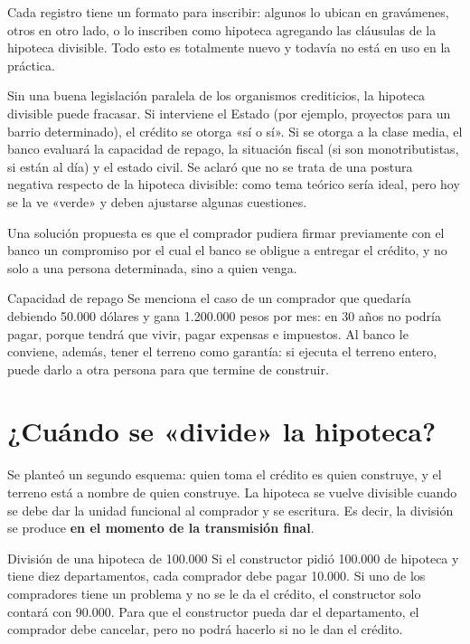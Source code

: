 \documentclass[12pt,oneside]{book}
\begin{document}
Cada registro tiene un formato para inscribir: algunos lo ubican en gravámenes, otros en otro lado, o lo inscriben como hipoteca agregando las cláusulas de la hipoteca divisible. Todo esto es totalmente nuevo y todavía no está en uso en la práctica.

\begin{important}
Sin una buena legislación paralela de los organismos crediticios, la hipoteca divisible puede fracasar. Si interviene el Estado (por ejemplo, proyectos para un barrio determinado), el crédito se otorga «sí o sí». Si se otorga a la clase media, el banco evaluará la capacidad de repago, la situación fiscal (si son monotributistas, si están al día) y el estado civil. Se aclaró que no se trata de una postura negativa respecto de la hipoteca divisible: como tema teórico sería ideal, pero hoy se la ve «verde» y deben ajustarse algunas cuestiones.
\end{important}

Una solución propuesta es que el comprador pudiera firmar previamente con el banco un compromiso por el cual el banco se obligue a entregar el crédito, y no solo a una persona determinada, sino a quien venga.

\begin{example}{Capacidad de repago}
Se menciona el caso de un comprador que quedaría debiendo 50.000 dólares y gana 1.200.000 pesos por mes: en 30 años no podría pagar, porque tendrá que vivir, pagar expensas e impuestos. Al banco le conviene, además, tener el terreno como garantía: si ejecuta el terreno entero, puede darlo a otra persona para que termine de construir.
\end{example}

\section{¿Cuándo se «divide» la hipoteca?}

Se planteó un segundo esquema: quien toma el crédito es quien construye, y el terreno está a nombre de quien construye. La hipoteca se vuelve divisible cuando se debe dar la unidad funcional al comprador y se escritura. Es decir, la división se produce \textbf{en el momento de la transmisión final}.

\begin{example}{División de una hipoteca de 100.000}
Si el constructor pidió 100.000 de hipoteca y tiene diez departamentos, cada comprador debe pagar 10.000. Si uno de los compradores tiene un problema y no se le da el crédito, el constructor solo contará con 90.000. Para que el constructor pueda dar el departamento, el comprador debe cancelar, pero no podrá hacerlo si no le dan el crédito.
\end{example}
\end{document}
